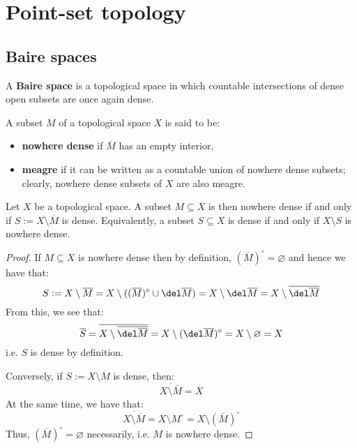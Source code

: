 \section{Point-set topology}
    \subsection{Baire spaces}
        \begin{definition} \label{def: baire_spaces}
            A \textbf{Baire space} is a topological space in which countable intersections of dense open subsets are once again dense.
        \end{definition}
        \begin{definition} \label{def: nowhere_dense_and_meagre_subsets}
            A subset $M$ of a topological space $X$ is said to be:
            \begin{itemize}
                \item \textbf{nowhere dense} if $\overline{M}$ has an empty interior,
                \item \textbf{meagre} if it can be written as a countable union of nowhere dense subsets; clearly, nowhere dense subsets of $X$ are also meagre. 
            \end{itemize}
        \end{definition}
        \begin{lemma} \label{lemma: nowhere_dense_subsets_are_complements_of_dense_subsets}
            Let $X$ be a topological space. A subset $M \subseteq X$ is then nowhere dense if and only if $S := X \setminus \overline{M}$ is dense. Equivalently, a subset $S \subseteq X$ is dense if and only if $X \setminus S$ is nowhere dense.
        \end{lemma}
            \begin{proof}
                If $M \subseteq X$ is nowhere dense then by definition, $(\overline{M})^{\circ} = \varnothing$ and hence we have that:
                    $$S := X \setminus \overline{M} = X \setminus ( (\overline{M})^{\circ} \cup \del \overline{M} ) = X \setminus \del \overline{M} = X \setminus \overline{\del \overline{M}}$$
                From this, we see that:
                    $$\overline{S} = \overline{X \setminus \overline{\del \overline{M}}} = X \setminus (\del \overline{M})^{\circ} = X \setminus \varnothing = X$$
                i.e. $S$ is dense by definition.
                
                Conversely, if $S := X \setminus \overline{M}$ is dense, then:
                    $$\overline{ X \setminus \overline{M} } = X$$
                At the same time, we have that:
                    $$\overline{ X \setminus \overline{M} } = X \setminus M^{\circ} = X \setminus (\overline{M})^{\circ}$$
                Thus, $(\overline{M})^{\circ} = \varnothing$ necessarily, i.e. $M$ is nowhere dense.
            \end{proof}
        
